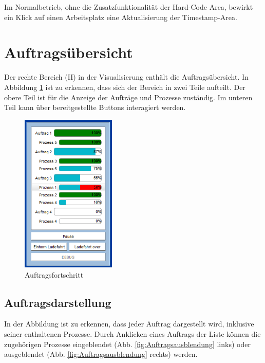 Im Normalbetrieb, ohne die Zusatzfunktionalität der Hard-Code Area, bewirkt ein Klick auf einen Arbeitsplatz eine Aktualisierung der Timestamp-Area. 

\section{Auftragsübersicht}
\label{sec:Auftragsuebersicht}

Der rechte Bereich (II) in der Visualisierung enthält die Auftragsübersicht. In Abbildung \ref{fig:Auftragsfortschritt} ist zu erkennen, dass sich der Bereich in zwei Teile aufteilt. Der obere Teil ist für die Anzeige der Aufträge und Prozesse zuständig. Im unteren Teil kann über bereitgestellte Buttons interagiert werden.

\begin{figure}[htb]
    \centering
    \includegraphics[width=0.4\textwidth]{Abbildungen/Auftragsfortschritt.png}
    \caption{Auftragsfortschritt}		
    \label{fig:Auftragsfortschritt}
\end{figure}

\subsection{Auftragsdarstellung}

In der Abbildung ist zu erkennen, dass jeder Auftrag dargestellt wird, inklusive seiner enthaltenen Prozesse. Durch Anklicken eines Auftrags der Liste können die zugehörigen Prozesse eingeblendet (Abb. \ref{fig:Auftragsausblendung} links) oder ausgeblendet (Abb. \ref{fig:Auftragsausblendung} rechts) werden. 


